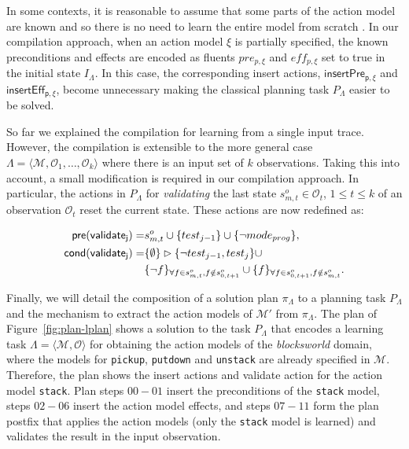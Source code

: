 \documentclass[runningheads]{llncs}
\newcommand{\tup}[1]{{\langle #1 \rangle}}
\newcommand{\pre}{\mathsf{pre}}     %
\newcommand{\cond}{\mathsf{cond}}   %
\begin{document}
In some contexts, it is reasonable to assume that some parts of the action model are known and so there is no need to learn the entire model from scratch \cite{ZhuoNK13}. In our compilation approach, when an action model $\xi$ is partially specified, the known preconditions and effects are encoded as fluents $pre_{p,\xi}$ and $eff_{p,\xi}$ set to true in the initial state $I_{\Lambda}$. In this case, the corresponding insert actions, $\mathsf{insertPre_{p,\xi}}$ and $\mathsf{insertEff_{p,\xi}}$, become unnecessary making the classical planning task $P_{\Lambda}$ easier to be solved.

So far we explained the compilation for learning from a single input trace. However, the compilation is extensible to the more general case $\Lambda=\tup{\mathcal{M},\mathcal{O}_1,\ldots,\mathcal{O}_k}$ where there is an input set of $k$ observations. Taking this into account, a small modification is required in our compilation approach. In particular, the actions in $P_{\Lambda}$ for {\em validating} the last state $s_{m,t}^o\in \mathcal{O}_t$, {\tt\small $1\leq t\leq k$} of an observation $\mathcal{O}_t$ reset the current state. These actions are now redefined as:


\begin{small}
	\begin{align*}
	\hspace*{7pt}\pre(\mathsf{validate_{j}})=&s_{m,t}^o\cup\{test_{j-1}\}\cup \{\neg mode_{prog}\},\\
	\cond(\mathsf{validate_{j}})=&\{\emptyset\}\rhd\{\neg test_{j-1},test_j\} \cup \\
	&\{\neg f\}_{\forall f\in s_{m,t}^o, f \notin s_{0,t+1}^o}\cup \{f\}_{\forall f\in s_{0,t+1}^o, f \notin s_{m,t}^o}.
	\end{align*}
\end{small}

Finally, we will detail the composition of a solution plan $\pi_\Lambda$ to a planning task $P_\Lambda$ and the mechanism to extract the action models of $\mathcal{M}'$ from $\pi_\Lambda$. The plan of Figure~\ref{fig:plan-lplan} shows a solution to the task $P_{\Lambda}$ that encodes a learning task $\Lambda=\tup{\mathcal{M},\mathcal{O}}$ for obtaining the action models of the {\em blocksworld} domain, where the models for {\tt\small pickup}, {\tt\small putdown} and {\tt\small unstack} are already specified in $\mathcal{M}$. Therefore, the plan shows the insert actions and validate action for the action model {\tt\small stack}. Plan steps $00-01$ insert the preconditions of the {\tt\small stack} model, steps $02-06$ insert the action model effects, and steps $07-11$ form the plan postfix that applies the action models (only the {\tt\small stack} model is learned) and validates the result in the input observation.
\end{document}
